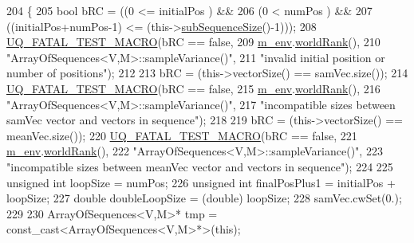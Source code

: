 \begin{DoxyCode}
204 \{
205   \textcolor{keywordtype}{bool} bRC = ((0                     <= initialPos                 ) &&
206               (0                     <  numPos                     ) &&
207               ((initialPos+numPos-1) <= (this->\hyperlink{class_q_u_e_s_o_1_1_array_of_sequences_a007d00d2398007b9bac82ed23eedb1e2}{subSequenceSize}()-1)));
208   \hyperlink{_defines_8h_a56d63d18d0a6d45757de47fcc06f574d}{UQ\_FATAL\_TEST\_MACRO}(bRC == \textcolor{keyword}{false},
209                       \hyperlink{class_q_u_e_s_o_1_1_base_vector_sequence_a8e8824d2a63c5a43bcc6473e3a0491e8}{m\_env}.\hyperlink{class_q_u_e_s_o_1_1_base_environment_a78b57112bbd0e6dd0e8afec00b40ffa7}{worldRank}(),
210                       \textcolor{stringliteral}{"ArrayOfSequences<V,M>::sampleVariance()"},
211                       \textcolor{stringliteral}{"invalid initial position or number of positions"});
212 
213   bRC = (this->vectorSize() == samVec.size());
214   \hyperlink{_defines_8h_a56d63d18d0a6d45757de47fcc06f574d}{UQ\_FATAL\_TEST\_MACRO}(bRC == \textcolor{keyword}{false},
215                       \hyperlink{class_q_u_e_s_o_1_1_base_vector_sequence_a8e8824d2a63c5a43bcc6473e3a0491e8}{m\_env}.\hyperlink{class_q_u_e_s_o_1_1_base_environment_a78b57112bbd0e6dd0e8afec00b40ffa7}{worldRank}(),
216                       \textcolor{stringliteral}{"ArrayOfSequences<V,M>::sampleVariance()"},
217                       \textcolor{stringliteral}{"incompatible sizes between samVec vector and vectors in sequence"});
218 
219   bRC = (this->vectorSize() == meanVec.size());
220   \hyperlink{_defines_8h_a56d63d18d0a6d45757de47fcc06f574d}{UQ\_FATAL\_TEST\_MACRO}(bRC == \textcolor{keyword}{false},
221                       \hyperlink{class_q_u_e_s_o_1_1_base_vector_sequence_a8e8824d2a63c5a43bcc6473e3a0491e8}{m\_env}.\hyperlink{class_q_u_e_s_o_1_1_base_environment_a78b57112bbd0e6dd0e8afec00b40ffa7}{worldRank}(),
222                       \textcolor{stringliteral}{"ArrayOfSequences<V,M>::sampleVariance()"},
223                       \textcolor{stringliteral}{"incompatible sizes between meanVec vector and vectors in sequence"});
224 
225   \textcolor{keywordtype}{unsigned} \textcolor{keywordtype}{int} loopSize      = numPos;
226   \textcolor{keywordtype}{unsigned} \textcolor{keywordtype}{int} finalPosPlus1 = initialPos + loopSize;
227   \textcolor{keywordtype}{double} doubleLoopSize = (double) loopSize;
228   samVec.cwSet(0.);
229 
230   ArrayOfSequences<V,M>* tmp = \textcolor{keyword}{const\_cast<}ArrayOfSequences<V,M>*\textcolor{keyword}{>}(\textcolor{keyword}{this});

\end{DoxyCode}
